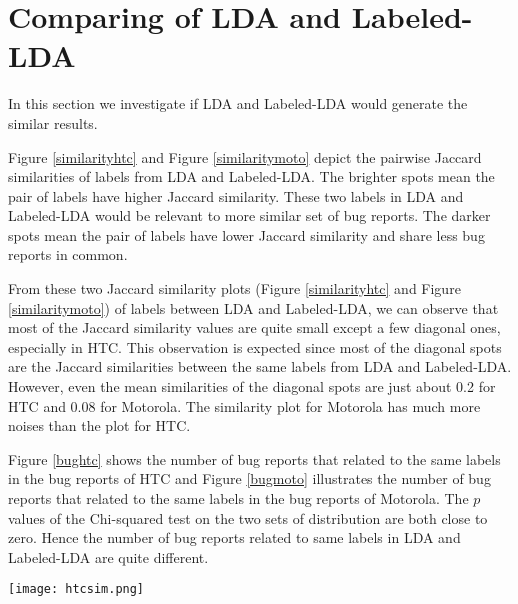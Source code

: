 \documentclass[10pt, conference, compsocconf]{IEEEtran}
\begin{document}



\section{Comparing of LDA and Labeled-LDA}
In this section we investigate if LDA and Labeled-LDA would generate the similar results.

Figure \ref{similarityhtc} and Figure \ref{similaritymoto} depict the pairwise Jaccard similarities of labels from LDA and Labeled-LDA. The brighter spots mean the pair of labels have higher Jaccard similarity. These two labels in LDA and Labeled-LDA would be relevant to more similar set of bug reports. The darker spots mean the pair of labels have lower Jaccard similarity and share less bug reports in common. 

From these two Jaccard similarity plots (Figure \ref{similarityhtc} and Figure \ref{similaritymoto}) of labels between LDA and Labeled-LDA, we can observe that most of the Jaccard similarity values are quite small except a few diagonal ones, especially in HTC. This observation is expected since most of the diagonal spots are the Jaccard similarities between the same labels from LDA and Labeled-LDA. However, even the mean similarities of the diagonal spots are just about 0.2 for HTC and 0.08 for Motorola. The similarity plot for Motorola has much more noises than the plot for HTC.  

Figure \ref{bughtc} shows the number of bug reports that related to the same labels in the bug reports of HTC and Figure \ref{bugmoto} illustrates the number of bug reports that related to the same labels in the bug reports of Motorola. The $ p $ values of the Chi-squared test on the two sets of distribution are both close to zero. Hence the number of bug reports related to same labels in LDA and Labeled-LDA are quite different.

\begin{figure*}[htb]
\centering
\texttt{[image: htcsim.png]}
\caption{Jaccard similarity of labels between LDA and Labeled-LDA in HTC. X axis is the labels in labeled-LDA and Y axis is the labels of topics generated by LDA. The label ``null" in the Y axis means that topic cannot be labeled. The result is based on the HTC bug reports under the threshold of document relevance of 0.2. Brighter means higher Jaccard similarity.}
\label{similarityhtc}
\end{figure*}
\end{document}
